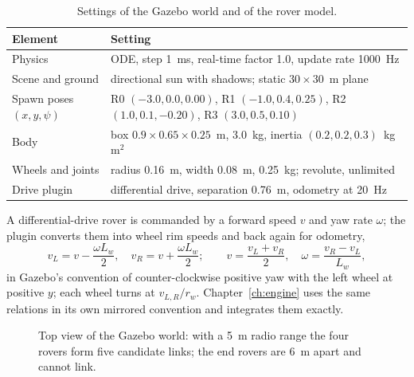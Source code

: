 \begin{table}[htbp]
\centering
\caption{Settings of the Gazebo world and of the rover model.}
\label{tab:gz:world}
\small
\begin{tabularx}{\linewidth}{@{}l X@{}}
\toprule
Element & Setting \\
\midrule
Physics & ODE, step 1~ms, real-time factor 1.0, update rate 1000~Hz \\
Scene and ground & directional sun with shadows; static $30\times30$~m plane \\
Spawn poses $(x,y,\psi)$ & R0 $(-3.0,0.0,0.00)$, R1 $(-1.0,0.4,0.25)$, R2 $(1.0,0.1,-0.20)$, R3 $(3.0,0.5,0.10)$ \\
Body & box $0.9\times0.65\times0.25$~m, 3.0~kg, inertia $(0.2,0.2,0.3)$~kg\,m$^2$ \\
Wheels and joints & radius 0.16~m, width 0.08~m, 0.25~kg; revolute, unlimited \\
Drive plugin & differential drive, separation 0.76~m, odometry at 20~Hz \\
\bottomrule
\end{tabularx}
\end{table}

A differential-drive rover is commanded by a forward speed $v$ and yaw rate
$\omega$; the plugin converts them into wheel rim speeds and back again for
odometry,
\begin{equation}
v_L=v-\frac{\omega L_w}{2},\quad v_R=v+\frac{\omega L_w}{2};\qquad
v=\frac{v_L+v_R}{2},\quad \omega=\frac{v_R-v_L}{L_w},
\label{eq:gz:diffdrive}
\end{equation}
in Gazebo's convention of counter-clockwise positive yaw with the left wheel at
positive $y$; each wheel turns at $v_{L,R}/r_w$. Chapter~\ref{ch:engine} uses
the same relations in its own mirrored convention and integrates them exactly.

\begin{figure}[htbp]
\centering
{}
\caption{Top view of the Gazebo world: with a 5~m radio range the four rovers
form five candidate links; the end rovers are 6~m apart and cannot link.}
\label{fig:gz:world}
\end{figure}

